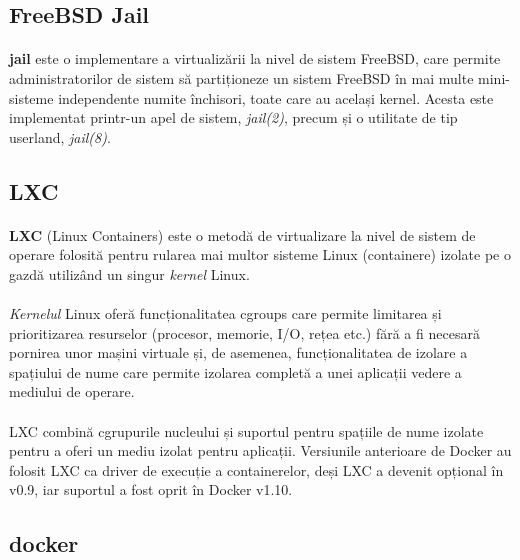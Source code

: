     \subsection{FreeBSD Jail}
        \paragraph{} \textbf{jail} este o implementare a virtualizării la nivel de sistem FreeBSD, care permite administratorilor de sistem să partiționeze un sistem FreeBSD în mai multe mini-sisteme independente numite închisori, toate care au același kernel. \cite{jail} Acesta este implementat printr-un apel de sistem, \textit{jail(2)}, precum și o utilitate de tip userland, \textit{jail(8)}. \cite{wiki:jail}

    \subsection{LXC}
        \paragraph{} \textbf{LXC} (Linux Containers) este o metodă de virtualizare la nivel de sistem de operare folosită pentru rularea mai multor sisteme Linux (containere) izolate pe o gazdă utilizând un singur \textit{kernel} Linux. \cite{wiki:lxc}
        \paragraph{} \textit{Kernelul} Linux oferă funcționalitatea cgroups care permite limitarea și prioritizarea resurselor (procesor, memorie, I/O, rețea etc.) fără a fi necesară pornirea unor mașini virtuale și, de asemenea, funcționalitatea de izolare a spațiului de nume care permite izolarea completă a unei aplicații vedere a mediului de operare. \cite{wiki:lxc}
        \paragraph{} LXC combină cgrupurile nucleului și suportul pentru spațiile de nume izolate pentru a oferi un mediu izolat pentru aplicații. Versiunile anterioare de Docker au folosit LXC ca driver de execuție a containerelor, deși LXC a devenit opțional în v0.9, iar suportul a fost oprit în Docker v1.10. \cite{lxc_docker}\cite{wiki:lxc}

    \subsection{docker}
